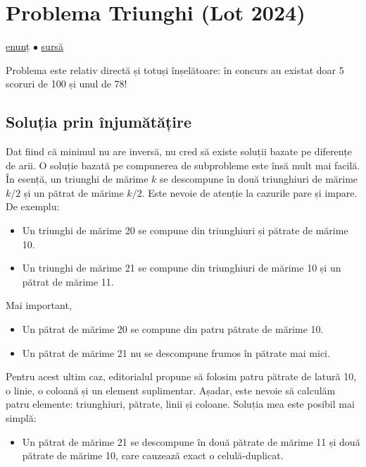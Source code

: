 \section{Problema Triunghi (Lot 2024)}
\label{problem:triunghi}

\href{https://kilonova.ro/problems/2797}{enunț}
$\bullet$
\hyperref[code:triunghi]{sursă}

Problema este relativ directă și totuși înșelătoare: în concurs au existat doar 5 scoruri de 100 și unul de 78!

\subsection{Soluția prin înjumătățire}

Dat fiind că minimul nu are inversă, nu cred să existe soluții bazate pe diferențe de arii. O soluție bazată pe compunerea de subprobleme este însă mult mai facilă. În esență, un triunghi de mărime $k$ se descompune în două triunghiuri de mărime $k / 2$ și un pătrat de mărime $k / 2$. Este nevoie de atenție la cazurile pare și impare. De exemplu:

\begin{itemize}
  \item Un triunghi de mărime 20 se compune din triunghiuri și pătrate de mărime 10.
  \item Un triunghi de mărime 21 se compune din triunghiuri de mărime 10 și un pătrat de mărime 11.
\end{itemize}

Mai important,

\begin{itemize}
  \item Un pătrat de mărime 20 se compune din patru pătrate de mărime 10.
  \item Un pătrat de mărime 21 nu se descompune frumos în pătrate mai mici.
\end{itemize}

Pentru acest ultim caz, editorialul propune să folosim patru pătrate de latură 10, o linie, o coloană și un element suplimentar. Așadar, este nevoie să calculăm patru elemente: triunghiuri, pătrate, linii și coloane. Soluția mea este posibil mai simplă:

\begin{itemize}
  \item Un pătrat de mărime 21 se descompune în două pătrate de mărime 11 și două pătrate de mărime 10, care cauzează exact o celulă-duplicat.
\end{itemize}

